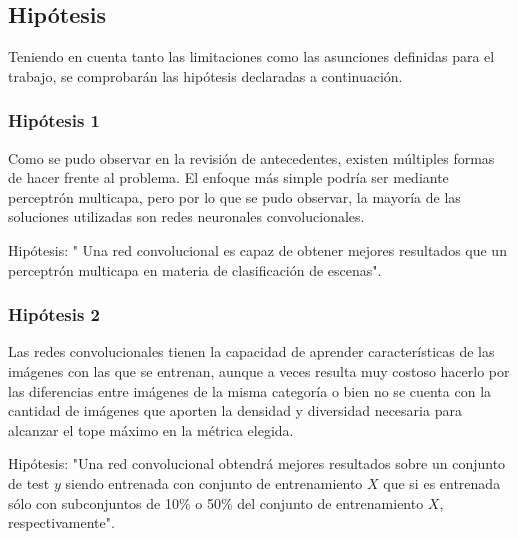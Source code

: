 \subsection{Hipótesis}
Teniendo en cuenta tanto las limitaciones como las asunciones definidas para el trabajo, se comprobarán las hipótesis declaradas a continuación. 

\subsubsection{Hipótesis 1} \label{sssec:hipotesis1}
Como se pudo observar en la revisión de antecedentes, existen múltiples formas de hacer frente al problema. El enfoque más simple podría ser mediante perceptrón multicapa, pero por lo que se pudo observar, la mayoría de las soluciones utilizadas son redes neuronales convolucionales. 

Hipótesis: " Una red convolucional es capaz de obtener mejores resultados que un perceptrón multicapa en materia de clasificación de escenas".

\subsubsection{Hipótesis 2} \label{sssec:hipotesis2}
Las redes convolucionales tienen la capacidad de aprender características de las imágenes con las que se entrenan, aunque a veces resulta muy costoso hacerlo por las diferencias entre imágenes de la misma categoría o bien no se cuenta con la cantidad de imágenes que aporten la densidad y diversidad necesaria para alcanzar el tope máximo en la métrica elegida. 

Hipótesis: "Una red convolucional obtendrá mejores resultados sobre un conjunto de test \(y\) siendo entrenada con conjunto de entrenamiento \(X\) que si es entrenada sólo con subconjuntos de 10\% o 50\% del conjunto de entrenamiento \(X\), respectivamente".


